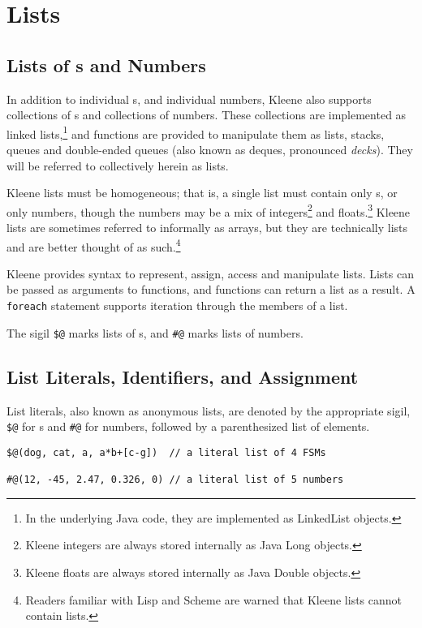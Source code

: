 \chapter{Lists}


\section{Lists of \fsm{}s and Numbers}

In addition to individual \fsm{}s, and individual numbers,
Kleene also supports collections of \fsm{}s and collections of numbers.
These collections are implemented as linked lists,\footnote{In the
underlying Java code, they are implemented as LinkedList objects.} and
functions are provided to manipulate them as lists, stacks, queues and
double-ended queues (also known as deques, pronounced \emph{decks}).
They will be referred to collectively herein as lists.

Kleene lists must be homogeneous; that is, a single list must contain
only \fsm{}s, or only numbers, though the numbers may be a mix of
integers\footnote{Kleene integers are always stored internally as Java
Long objects.} and floats.\footnote{Kleene floats are always stored
internally as Java Double objects.}  Kleene lists are sometimes referred
to informally as arrays, but they are technically lists and are better
thought of as such.\footnote{Readers familiar with Lisp and Scheme are
warned that Kleene lists cannot contain lists.}

Kleene provides syntax to represent, assign, access and manipulate lists.
Lists can be passed as arguments to functions, and functions can
return a list as a result.  A \texttt{foreach} statement supports
iteration through the members of a list.

The sigil \verb!$@! marks lists of \fsm{}s, and \verb!#@! marks lists of
numbers. 

\section{List Literals, Identifiers, and Assignment}

List literals, also known as anonymous lists, are denoted by the
appropriate sigil, \verb!$@! for \fsm{}s and \verb!#@! for numbers, followed
by a parenthesized list of elements.

\begin{Verbatim}
$@(dog, cat, a, a*b+[c-g])  // a literal list of 4 FSMs 

#@(12, -45, 2.47, 0.326, 0) // a literal list of 5 numbers
\end{Verbatim}

